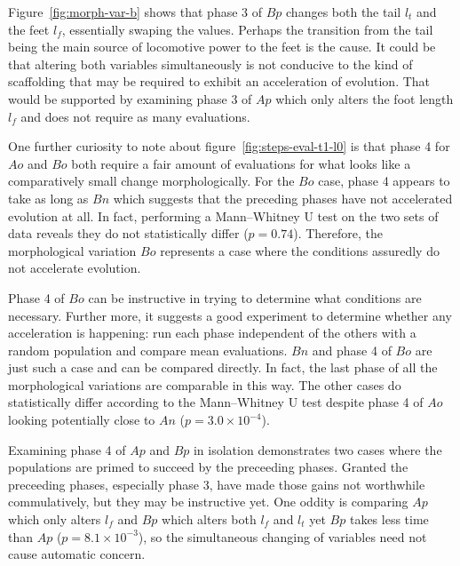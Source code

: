 Figure~\ref{fig:morph-var-b} shows that phase 3 of $Bp$ changes both
the tail $l_t$ and the feet $l_f$, essentially swaping the values.
Perhaps the transition from the tail being the main source of
locomotive power to the feet is the cause.  It could be that altering
both variables simultaneously is not conducive to the kind of
scaffolding that may be required to exhibit an acceleration of
evolution.  That would be supported by examining phase 3 of $Ap$ which
only alters the foot length $l_f$ and does not require as many
evaluations.

One further curiosity to note about figure~\ref{fig:steps-eval-t1-l0}
is that phase 4 for $Ao$ and $Bo$ both require a fair amount of
evaluations for what looks like a comparatively small change
morphologically.  For the $Bo$ case, phase 4 appears to take as long
as $Bn$ which suggests that the preceding phases have not accelerated
evolution at all.  In fact, performing a Mann--Whitney U test on the
two sets of data reveals they do not statistically differ ($p =
0.74$).  Therefore, the morphological variation $Bo$ represents a case
where the conditions assuredly do not accelerate evolution.

Phase 4 of $Bo$ can be instructive in trying to determine what
conditions are necessary.  Further more, it suggests a good experiment
to determine whether any acceleration is happening: run each phase
independent of the others with a random population and compare mean
evaluations.  $Bn$ and phase 4 of $Bo$ are just such a case and can be
compared directly.  In fact, the last phase of all the morphological
variations are comparable in this way. The other cases do
statistically differ according to the Mann--Whitney U test despite
phase 4 of $Ao$ looking potentially close to $An$ ($p = 3.0 \times
10^{-4}$).

Examining phase 4 of $Ap$ and $Bp$ in isolation demonstrates two cases
where the populations are primed to succeed by the preceeding phases.
Granted the preceeding phases, especially phase 3, have made those
gains not worthwhile commulatively, but they may be instructive yet.
One oddity is comparing $Ap$ which only alters $l_f$ and $Bp$ which
alters both $l_f$ and $l_t$ yet $Bp$ takes less time than $Ap$ ($p =
8.1 \times 10^{-3}$), so the simultaneous changing of variables need
not cause automatic concern.


